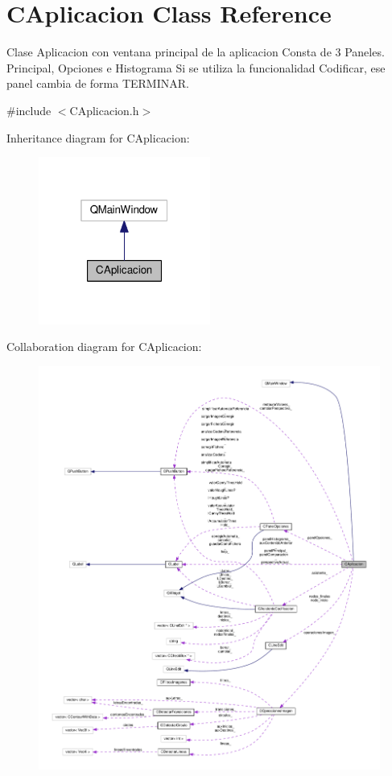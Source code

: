 \hypertarget{classCAplicacion}{}\section{C\+Aplicacion Class Reference}
\label{classCAplicacion}


Clase Aplicacion con ventana principal de la aplicacion Consta de 3 Paneles. Principal, Opciones e Histograma Si se utiliza la funcionalidad Codificar, ese panel cambia de forma T\+E\+R\+M\+I\+N\+AR.  




{\ttfamily \#include $<$C\+Aplicacion.\+h$>$}



Inheritance diagram for C\+Aplicacion\+:\nopagebreak
\begin{figure}[H]
\begin{center}
\leavevmode
\includegraphics[width=160pt]{classCAplicacion__inherit__graph}
\end{center}
\end{figure}


Collaboration diagram for C\+Aplicacion\+:
\nopagebreak
\begin{figure}[H]
\begin{center}
\leavevmode
\includegraphics[width=350pt]{classCAplicacion__coll__graph}
\end{center}
\end{figure}
